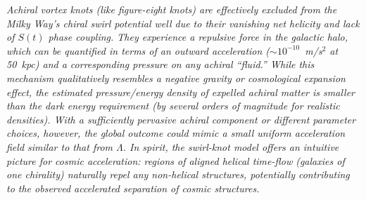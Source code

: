 \medskip

\textit{Achiral vortex knots (like figure-eight knots) are effectively excluded from the Milky Way’s chiral swirl potential well due to their vanishing net helicity and lack of $S(t)$ phase coupling. They experience a repulsive force in the galactic halo, which can be quantified in terms of an outward acceleration ($\sim 10^{-10}$~m/s$^2$ at 50~kpc) and a corresponding pressure on any achiral “fluid.” While this mechanism qualitatively resembles a negative gravity or cosmological expansion effect, the estimated pressure/energy density of expelled achiral matter is smaller than the dark energy requirement (by several orders of magnitude for realistic densities). With a sufficiently pervasive achiral component or different parameter choices, however, the global outcome could mimic a small uniform acceleration field similar to that from $\Lambda$. In spirit, the swirl-knot model offers an intuitive picture for cosmic acceleration: regions of aligned helical time-flow (galaxies of one chirality) naturally repel any non-helical structures, potentially contributing to the observed accelerated separation of cosmic structures.}

\medskip
